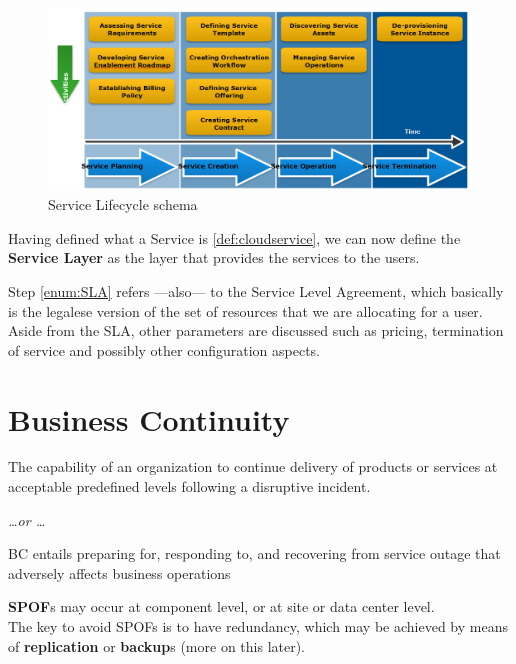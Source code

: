 \begin{figure}[htbp]
   \centering
   \includegraphics{images/servicelifecycle.png}
   \caption{Service Lifecycle schema}
   \label{fig:servicelifecycle}
\end{figure}

Having defined what a Service is \ref{def:cloudservice}, we can now define the \textbf{Service Layer} as the layer that provides the services to the users.

Step \ref{enum:SLA} refers ---also--- to the Service Level Agreement, which basically is the legalese version of the set of resources that we are allocating for a user.\\
Aside from the SLA, other parameters are discussed such as pricing, termination of service and possibly other configuration aspects.


\section{Business Continuity}
\begin{definition}
   The capability of an organization to continue delivery of products or services at acceptable predefined levels following a disruptive incident.

   \emph{\dots or \dots}
   
   BC entails preparing for, responding to, and recovering from service outage that adversely affects business operations
\end{definition}

\textbf{SPOF}s may occur at component level, or at site or data center level.\\
The key to avoid SPOFs is to have redundancy, which may be achieved by means of \textbf{replication} or \textbf{backup}s (more on this later).
\nl

